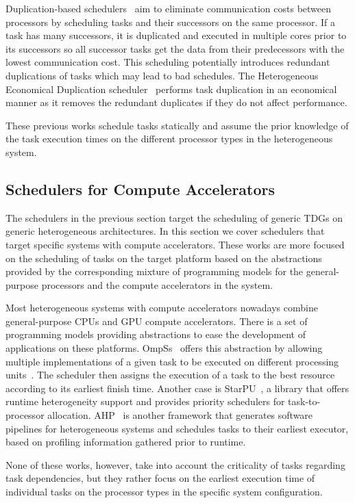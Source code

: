 Duplication-based schedulers~\cite{Dup03, Dup11, Dup09} aim to eliminate communication costs between processors by scheduling tasks and their successors on the same processor. If a task has many successors, it is duplicated and executed in multiple cores prior to its successors so all successor tasks get the data from their predecessors with the lowest communication cost. This scheduling potentially introduces redundant duplications of tasks which may lead to bad schedules. The Heterogeneous Economical Duplication scheduler~\cite{Dup09} performs task duplication in an economical manner as it removes the redundant duplicates if they do not affect performance. 

These previous works schedule tasks statically and assume the prior knowledge of the task execution times on the different processor types in the heterogeneous system.

\subsection{Schedulers for Compute Accelerators}

The schedulers in the previous section target the scheduling of generic TDGs on generic heterogeneous architectures. In this section we cover schedulers that target specific systems with compute accelerators. These works are more focused on the scheduling of tasks on the target platform based on the abstractions provided by the corresponding mixture of programming models for the general-purpose processors and the compute accelerators in the system.

Most heterogeneous systems with compute accelerators nowadays combine general-purpose CPUs and GPU compute accelerators. There is a set of programming models providing abstractions to ease the development of applications on these platforms. OmpSs~\cite{OmpSs_PPL11, OmpSs} offers this abstraction by allowing multiple implementations of a given task to be executed on different processing units~\cite{Planas:IPDPS2013}. The scheduler then assigns the execution of a task to the best resource according to its earliest finish time. Another case is StarPU~\cite{starpu}, a library that offers runtime heterogeneity support and provides priority schedulers for task-to-processor allocation. AHP~\cite{AHP} is another framework that generates software pipelines for heterogeneous systems and schedules tasks to their earliest executor, based on profiling information gathered prior to runtime.

None of these works, however, take into account the criticality of tasks regarding task dependencies, but they rather focus on the earliest execution time of individual tasks on the processor types in the specific system configuration.

